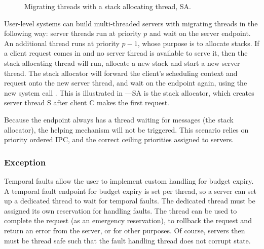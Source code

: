 \begin{figure}
    \centering
    \caption{Migrating threads with a stack allocating thread, SA.}
    \label{fig:migrating-threads}
\end{figure}

User-level systems can build multi-threaded servers with migrating threads in the following way: server threads run at priority $p$ and wait on the server endpoint.
An additional thread runs at priority $p - 1$, whose purpose is to allocate stacks.
If a client request comes in and no server thread is available to serve it, then the stack allocating thread will run, allocate a new stack and start a new server thread.
The stack allocator will forward the client's scheduling context and request onto the new server thread, and wait on the endpoint again, using the new system call \sendwait.
This is illustrated in ---SA is the stack allocator, which creates server thread S after client C makes the first request.

Because the endpoint always has a thread waiting for messages (the stack allocator), the helping mechanism will not be triggered.
This scenario relies on priority ordered \gls{IPC}, and the correct ceiling priorities assigned to servers.

\subsubsection{Exception}

Temporal faults allow the user to implement custom handling for budget expiry.
A temporal fault endpoint for budget expiry is set per thread, so a server can set up a dedicated thread to wait for temporal faults.
The dedicated thread must be assigned its own reservation for handling faults.
The thread can be used to complete the request (as an emergency reservation), to rollback the request and return an error from the server, or for other purposes.
Of course, servers then must be thread safe such that the fault handling thread does not corrupt state.


